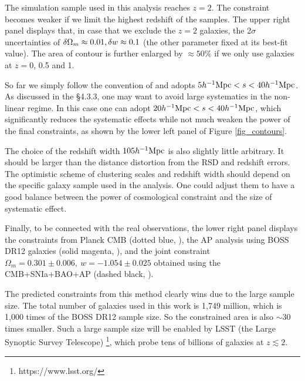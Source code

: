 \documentclass[iop]{emulateapj}
\newcommand{\hMpc}{{\ifmmode{h^{-1}{\rm Mpc}}\else{$h^{-1}$Mpc }\fi}}
\begin{document}
The simulation sample used in this analysis reaches $z=2$.
The constraint becomes weaker if we limit the highest redshift of the samples.
The upper right panel displays that, 
in case that we exclude the $z=2$ galaxies, 
the 2$\sigma$ uncertainties of $\delta\Omega_m\approx0.01,\\ \delta w\approx0.1$ (the other parameter fixed at its best-fit value).
The area of contour is further enlarged by $\approx 50\%$ if we only use galaxies at $z=$0, 0.5 and 1.

So far we simply follow the convention of \cite{Li2016} and adopts $5\hMpc <s< 40\hMpc$. 
As discussed in the \S 4.3.3, one may want to avoid large systematics in the non-linear regime. 
In this case one can adopt $20\hMpc<s<40\hMpc$,
which significantly reduces the systematic effects while not much weaken the power of the final constraints,
as shown by the lower left panel of Figure \ref{fig_contours}.

The choice of the redshift width $105 \hMpc$ is also slightly little arbitrary. 
It should be larger than the distance distortion from the RSD and redshift errors.
The optimistic scheme of clustering scales and redshift width should depend on the specific galaxy sample used in the analysis. 
One could adjust them to have a good balance between the power of cosmological constraint and the size of systematic effect.

Finally, to be connected with the real observations, 
the lower right panel displays the constraints from Planck CMB (dotted blue, \cite{Planck2015}),
the AP analysis using BOSS DR12 galaxies (solid magenta, \cite{Li2016}),
and the joint constraint $\Omega_m = 0.301 \pm 0.006,\ w=-1.054 \pm 0.025$ 
obtained using the CMB+SNIa+BAO+AP (dashed black, \cite{6dFGS,MGS,Riess2011,JLA,Anderson2013,Li2016}).

The predicted constraints from this method clearly wins due to the large sample size.
The total number of galaxies used in this work is 1,749 million,
which is 1,000 times of the BOSS DR12 sample size.
So the constrained area is also $\sim 30$ times smaller.
Such a large sample size will be enabled by LSST (the Large Synoptic Survey Telescope) \footnote{https://www.lsst.org/}, 
which probe tens of billions of galaxies at $z\lesssim2$.


\end{document}
